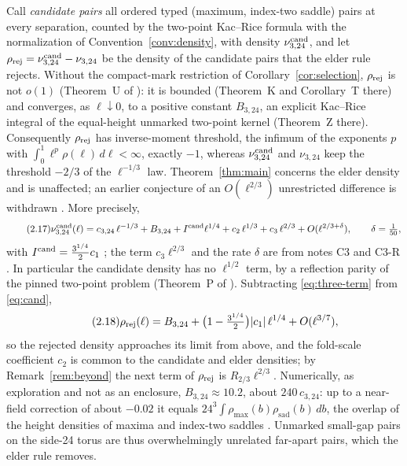 \begin{remark}\label{rem:cand}
Call \emph{candidate pairs} all ordered typed (maximum, index-two saddle) pairs at every separation, counted by the two-point Kac--Rice formula with the normalization of Convention~\ref{conv:density}, with density $\nu^{\mathrm{cand}}_{3,24}$, and let $\rho_{\mathrm{rej}}=\nu^{\mathrm{cand}}_{3,24}-\nu_{3,24}$ be the density of the candidate pairs that the elder rule rejects. Without the compact-mark restriction of Corollary~\ref{cor:selection}, $\rho_{\mathrm{rej}}$ is not $o(1)$ (Theorem~U of ): it is bounded (Theorem~K and Corollary~T there) and converges, as $\ell\downarrow0$, to a positive constant $B_{3,24}$, an explicit Kac--Rice integral of the equal-height unmarked two-point kernel (Theorem~Z there). Consequently $\rho_{\mathrm{rej}}$ has inverse-moment threshold, the infimum of the exponents $p$ with $\int_0^1\ell^p\rho(\ell)\,d\ell<\infty$, exactly $-1$, whereas $\nu^{\mathrm{cand}}_{3,24}$ and $\nu_{3,24}$ keep the threshold $-2/3$ of the $\ell^{-1/3}$ law. Theorem~\ref{thm:main} concerns the elder density and is unaffected; an earlier conjecture of an $O(\ell^{2/3})$ unrestricted difference is withdrawn . More precisely,
\begin{equation}\tag{2.17}\label{eq:cand}
\nu^{\mathrm{cand}}_{3,24}(\ell)=c_{3,24}\,\ell^{-1/3}+B_{3,24}+I^{\mathrm{cand}}\ell^{1/4}+c_2\,\ell^{1/3}+c_3\,\ell^{2/3}+O(\ell^{2/3+\delta}),\qquad \delta=\tfrac1{50},
\end{equation}
with $I^{\mathrm{cand}}=\tfrac{3^{1/4}}{2}c_1$ ; the term $c_3\ell^{2/3}$ and the rate $\delta$ are from notes C3 and C3-R . In particular the candidate density has no $\ell^{1/2}$ term, by a reflection parity of the pinned two-point problem (Theorem~P of ). Subtracting \eqref{eq:three-term} from \eqref{eq:cand},
\begin{equation}\tag{2.18}
\rho_{\mathrm{rej}}(\ell)=B_{3,24}+\bigl(1-\tfrac{3^{1/4}}2\bigr)|c_1|\,\ell^{1/4}+O(\ell^{3/7}),
\end{equation}
so the rejected density approaches its limit from above, and the fold-scale coefficient $c_2$ is common to the candidate and elder densities; by Remark~\ref{rem:beyond} the next term of $\rho_{\mathrm{rej}}$ is $R_{2/3}\ell^{2/3}$. Numerically, as exploration and not as an enclosure, $B_{3,24}\approx10.2$, about $240\,c_{3,24}$: up to a near-field correction of about $-0.02$ it equals $24^3\int\rho_{\max}(b)\rho_{\mathrm{sad}}(b)\,db$, the overlap of the height densities of maxima and index-two saddles . Unmarked small-gap pairs on the side-24 torus are thus overwhelmingly unrelated far-apart pairs, which the elder rule removes.
\end{remark}
